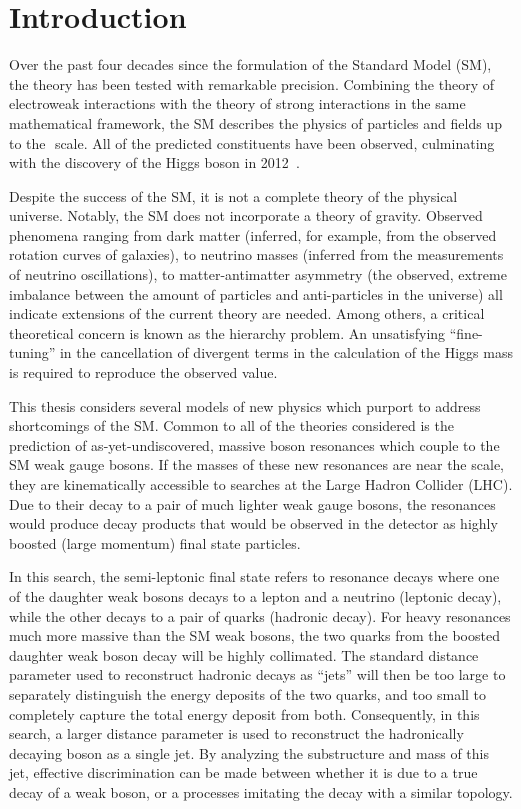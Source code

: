 \chapter{Introduction}
\label{ch:intro}

Over the past four decades since the formulation of the Standard Model (SM), the theory has been tested with remarkable precision. 
Combining the theory of electroweak interactions with the theory of strong interactions in the same mathematical framework, the SM describes the physics of particles and fields up to the\,\TeV\, scale. All of the predicted constituents have been observed, culminating with the discovery of the Higgs boson in 2012~\cite{Higgs_atlas,Higgs_cms}.

Despite the success of the SM, it is not a complete theory of the physical universe. Notably, the SM does not incorporate a theory of gravity. Observed phenomena ranging from dark matter (inferred, for example, from the observed rotation curves of galaxies), to neutrino masses (inferred from the measurements of neutrino oscillations), to matter-antimatter asymmetry (the observed, extreme imbalance between the amount of particles and anti-particles in the universe) all indicate extensions of the current theory are needed. Among others, a critical theoretical concern is known as the hierarchy problem. An unsatisfying ``fine-tuning'' in the cancellation of divergent terms in the calculation of the Higgs mass is required to reproduce the observed value. 

This thesis considers several models of new physics which purport to address shortcomings of the SM. Common to all of the theories considered is the prediction of as-yet-undiscovered, massive boson resonances which couple to the SM weak gauge bosons. If the masses of these new resonances are near the\,\TeV\,scale, they are kinematically accessible to searches at the Large Hadron Collider (LHC). Due to their decay to a pair of much lighter weak gauge bosons, the resonances would produce decay products that would be observed in the detector as highly boosted (large momentum) final state particles. 

In this search, the semi-leptonic final state refers to resonance decays where one of the daughter weak bosons decays to a lepton and a neutrino (leptonic decay), while the other decays to a pair of quarks (hadronic decay). For heavy resonances much more massive than the SM weak bosons, the two quarks from the boosted daughter weak boson decay will be highly collimated. The standard distance parameter used to reconstruct hadronic decays as ``jets'' will then be too large to separately distinguish the energy deposits of the two quarks, and too small to completely capture the total energy deposit from both. Consequently, in this search, a larger distance parameter is used to reconstruct the hadronically decaying boson as a single jet. By analyzing the substructure and mass of this jet, effective discrimination can be made between whether it is due to a true decay of a weak boson, or a processes imitating the decay with a similar topology.

